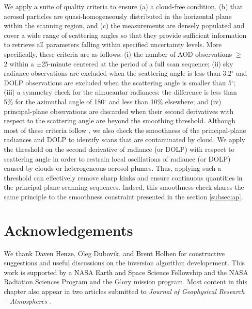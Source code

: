 We apply a suite of quality criteria to ensure (a) a cloud-free condition,
(b) that aerosol particles are quasi-homogeneously distributed in the
horizontal plane within the scanning region, and (c) the measurements
are densely populated and cover a wide range of scattering angles so
that they provide sufficient information to retrieve all parameters
falling within specified uncertainty levels. More specifically, these
criteria are as follows: (i) the number of AOD observations $\geq$ 2 within a 
$\pm$25-minute centered at the period of a full scan sequence; (ii) sky
radiance observations are excluded when the scattering angle is less
than 3.2$^\circ$ and DOLP observations are excluded when the scattering angle
is smaller than 5$^\circ$; (iii) a symmetry check for the almucantar radiances: the
difference is less than 5\% for the azimuthal angle of 180$^\circ$ and less than
10\% elsewhere; and (iv) principal-plane observations are discarded when
their second derivatives with respect to the scattering angle are beyond
the smoothing threshold. Although most of these criteria follow
\citet{Holben06}, we also check the smoothness of the principal-plane
radiances and DOLP to identify scans that are contaminated by cloud. We
apply the threshold on the second derivative of radiance (or DOLP) with
respect to scattering angle in order to restrain local oscillations of
radiance (or DOLP) caused by clouds or heterogeneous aerosol plumes.
Thus, applying such a threshold can effectively remove sharp kinks and
ensure continuous quantities in the principal-plane scanning sequences. 
Indeed, this smoothness check shares the same principle to the smoothness 
constraint presented in the section \ref{subsec:ap}. 

\section{Acknowledgements}

We thank Daven Henze, Oleg Dubovik, and Brent Holben for constructive
suggestions and useful discussions on the inversion algorithm
developement. This work is supported by a NASA Earth and Space Science
Fellowship and the NASA Radiation Sciences Program and the Glory mission
program. Most content in this chapter also appear in two articles
submitted to \textit{Journal of Geophysical Research – Atmospheres}
\citep{Xu15a, Xu15b}.
